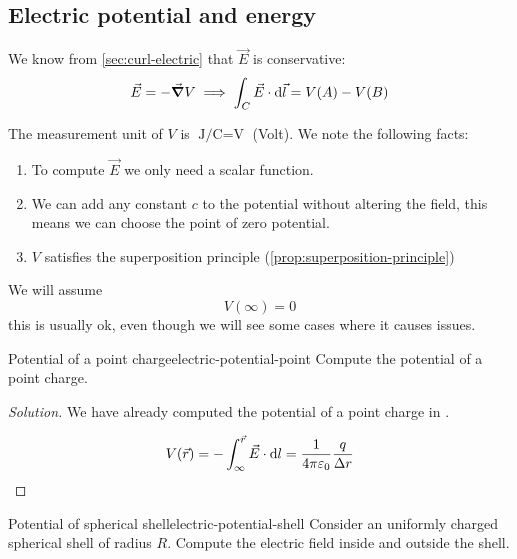 \documentclass[12pt]{extarticle}
\begin{document}
\subsection{Electric potential and energy}

We know from \cref{sec:curl-electric} that $\vec E$ is conservative:
\begin{equation}
	\vec E = - \grad V \implies \int_C \vec E \cdot \dd{\vec l} = V(A) - V(B)
\end{equation}

The measurement unit of $V$ is $\si{\joule \per \coulomb} = \si{\volt}$ (Volt).
We note the following facts:
\begin{enumerate}[label=\roman*.]
	\item To compute $\vec E$ we only need a scalar function.
	\item We can add any constant $c$ to the potential without altering the field, this means we can choose the point of zero potential.
	\item $V$ satisfies the superposition principle (\cref{prop:superposition-principle})
\end{enumerate}

We will assume
\begin{equation}
	V(\infty) = 0
\end{equation}
this is usually ok, even though we will see some cases where it causes issues.

\begin{example}{Potential of a point charge}{electric-potential-point}
	Compute the potential of a point charge.
\end{example}
\begin{proof}[Solution]
	We have already computed the potential of a point charge in .

	\begin{equation}
		V(\vec r) = - \int_{\infty}^{\vec r} \vec E \cdot \dd{l} = \frac{1}{4 \pi \varepsilon_0} \frac{q}{\Delta r}
	\end{equation}
\end{proof}

\begin{example}{Potential of spherical shell}{electric-potential-shell}
	Consider an uniformly charged spherical shell of radius $R$.
	Compute the electric field inside and outside the shell.
\end{example}
\end{document}
